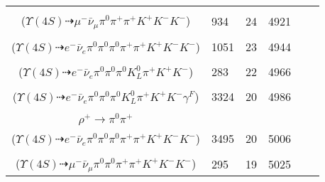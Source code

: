\documentclass[landscape]{article}
\newcounter{rownumbers}
\newcommand\rn{\stepcounter{rownumbers}\arabic{rownumbers}}
\newcommand{\EOL}{\\} %
\newcommand{\topoTags}[1]{#1} %
\begin{document}
\begin{longtable}{clcccc}
\rn & \makecell[l]{ $ 
\Upsilon(4S) \rightarrow B^{0} \bar{B}^{0} ,
B^{0} \rightarrow \pi^{0} K^{+} K^{-} ,
\bar{B}^{0} \rightarrow \mu^{-} \bar{\nu}_{\mu} D^{+} ,
D^{+} \rightarrow \pi^{+} \pi^{+} K^{-} 
$ \\ ($
\Upsilon(4S) \dashrightarrow \mu^{-} \bar{\nu}_{\mu} \pi^{0} \pi^{+} \pi^{+} K^{+} K^{-} K^{-} 
$) } & \topoTags{934 & }24 & 4921 \EOL

\rn & \makecell[l]{ $ 
\Upsilon(4S) \rightarrow B^{0} \bar{B}^{0} ,
B^{0} \rightarrow \pi^{0} K^{+} K^{-} ,
\bar{B}^{0} \rightarrow e^{-} \bar{\nu}_{e} D^{*+} ,
D^{*+} \rightarrow \pi^{+} D^{0} ,
D^{0} \rightarrow \pi^{0} \pi^{0} \pi^{+} K^{-} 
$ \\ ($
\Upsilon(4S) \dashrightarrow e^{-} \bar{\nu}_{e} \pi^{0} \pi^{0} \pi^{0} \pi^{+} \pi^{+} K^{+} K^{-} K^{-} 
$) } & \topoTags{1051 & }23 & 4944 \EOL

\rn & \makecell[l]{ $ 
\Upsilon(4S) \rightarrow B^{0} \bar{B}^{0} ,
B^{0} \rightarrow \pi^{0} K^{+} K^{-} ,
\bar{B}^{0} \rightarrow e^{-} \bar{\nu}_{e} D^{*+} ,
D^{*+} \rightarrow \pi^{0} D^{+} ,
D^{+} \rightarrow \pi^{0} K_{L}^{0} \pi^{+} 
$ \\ ($
\Upsilon(4S) \dashrightarrow e^{-} \bar{\nu}_{e} \pi^{0} \pi^{0} \pi^{0} K_{L}^{0} \pi^{+} K^{+} K^{-} 
$) } & \topoTags{283 & }22 & 4966 \EOL

\rn & \makecell[l]{ $ 
\Upsilon(4S) \rightarrow B^{0} \bar{B}^{0} ,
B^{0} \rightarrow \pi^{0} K^{+} K^{-} ,
\bar{B}^{0} \rightarrow e^{-} \bar{\nu}_{e} D^{*+} \gamma^{F} ,
D^{*+} \rightarrow \pi^{0} D^{+} ,
D^{+} \rightarrow \pi^{0} K_{L}^{0} \pi^{+} 
$ \\ ($
\Upsilon(4S) \dashrightarrow e^{-} \bar{\nu}_{e} \pi^{0} \pi^{0} \pi^{0} K_{L}^{0} \pi^{+} K^{+} K^{-} \gamma^{F} 
$) } & \topoTags{3324 & }20 & 4986 \EOL

\rn & \makecell[l]{ $ 
\Upsilon(4S) \rightarrow B^{0} \bar{B}^{0} ,
B^{0} \rightarrow \pi^{0} K^{+} K^{-} ,
\bar{B}^{0} \rightarrow e^{-} \bar{\nu}_{e} D^{*+} ,
D^{*+} \rightarrow \pi^{+} D^{0} ,
D^{0} \rightarrow K^{-} a_{1}^{+} ,
a_{1}^{+} \rightarrow \pi^{0} \rho^{+} ,
$ \\ $
\rho^{+} \rightarrow \pi^{0} \pi^{+} 
$ \\ ($
\Upsilon(4S) \dashrightarrow e^{-} \bar{\nu}_{e} \pi^{0} \pi^{0} \pi^{0} \pi^{+} \pi^{+} K^{+} K^{-} K^{-} 
$) } & \topoTags{3495 & }20 & 5006 \EOL

\rn & \makecell[l]{ $ 
\Upsilon(4S) \rightarrow B^{0} \bar{B}^{0} ,
B^{0} \rightarrow \pi^{0} K^{+} K^{-} ,
\bar{B}^{0} \rightarrow \mu^{-} \bar{\nu}_{\mu} D^{*+} ,
D^{*+} \rightarrow \pi^{0} D^{+} ,
D^{+} \rightarrow \pi^{+} \pi^{+} K^{-} 
$ \\ ($
\Upsilon(4S) \dashrightarrow \mu^{-} \bar{\nu}_{\mu} \pi^{0} \pi^{0} \pi^{+} \pi^{+} K^{+} K^{-} K^{-} 
$) } & \topoTags{295 & }19 & 5025 \EOL


\end{longtable}
\end{document}
